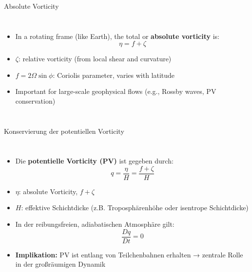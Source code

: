     \begin{frame}{Absolute Vorticity}
        \begin{columns}
          \begin{itemize}
            \item In a rotating frame (like Earth), the total or \textbf{absolute vorticity} is:
            \[
              \eta = f + \zeta
            \]
            \item \( \zeta \): relative vorticity (from local shear and curvature)
            \item \( f = 2\Omega \sin\phi \): Coriolis parameter, varies with latitude
            \item Important for large-scale geophysical flows (e.g., Rossby waves, PV conservation)
          \end{itemize}
        
          \vspace{2cm}
        \end{columns}
        \end{frame}
        
        \begin{frame}{Konservierung der potentiellen Vorticity}
            \begin{columns}
              \begin{itemize}
                \item Die \textbf{potentielle Vorticity (PV)} ist gegeben durch:
                \[
                  q = \frac{\eta}{H} = \frac{f + \zeta}{H}
                \]
                \item \( \eta \): absolute Vorticity, \( f + \zeta \)
                \item \( H \): effektive Schichtdicke (z.B. Troposphärenhöhe oder isentrope Schichtdicke)
                \item In der reibungsfreien, adiabatischen Atmosphäre gilt:
                \[
                  \frac{Dq}{Dt} = 0
                \]
                \item \textbf{Implikation:} PV ist entlang von Teilchenbahnen erhalten → zentrale Rolle in der großräumigen Dynamik
              \end{itemize}
            
              \vspace{2cm}
            \end{columns}
            \end{frame}
            


